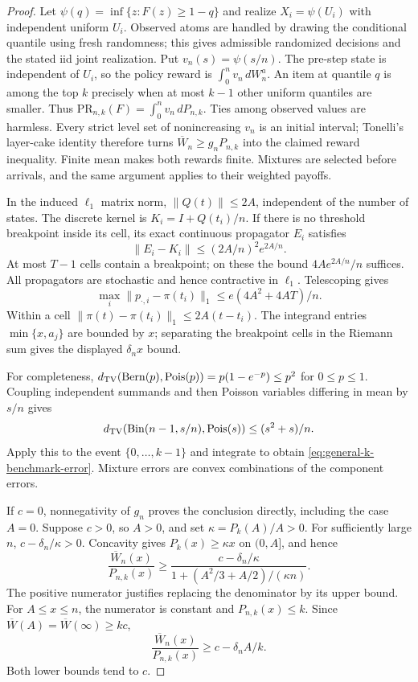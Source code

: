 \documentclass[11pt]{article}
\theoremstyle{remark}
\begin{document}
\begin{proof}
Let $\psi(q)=\inf\{z:F(z)\ge1-q\}$ and realize
$X_i=\psi(U_i)$ with independent uniform $U_i$. Observed atoms are
handled by drawing the conditional quantile using fresh randomness;
this gives admissible randomized decisions and the stated iid joint
realization. Put $v_n(s)=\psi(s/n)$. The pre-step state is independent
of $U_i$, so the policy reward is $\int_0^n v_n\,dW_n^a$. An item at
quantile $q$ is among the top $k$ precisely when at most $k-1$ other
uniform quantiles are smaller. Thus
$\mathrm{PR}_{n,k}(F)=\int_0^n v_n\,dP_{n,k}$. Ties among observed
values are harmless. Every strict level set of nonincreasing $v_n$ is
an initial interval; Tonelli's layer-cake identity therefore turns
$\overline W_n\ge g_nP_{n,k}$ into the claimed reward inequality.
Finite mean makes both rewards finite. Mixtures are selected before
arrivals, and the same argument applies to their weighted payoffs.

In the induced $\ell_1$ matrix norm, $\|Q(t)\|\le2A$, independent of
the number of states. The discrete kernel is $K_i=I+Q(t_i)/n$. If
there is no threshold breakpoint inside its cell, its exact continuous
propagator $E_i$ satisfies
\[
 \|E_i-K_i\|\le(2A/n)^2e^{2A/n}.
\]
At most $T-1$ cells contain a breakpoint; on these the bound
$4Ae^{2A/n}/n$ suffices. All propagators are stochastic and hence
contractive in $\ell_1$. Telescoping gives
\[
 \max_i\|p_{\cdot,i}-\pi(t_i)\|_1
 \le e(4A^2+4AT)/n.
\]
Within a cell $\|\pi(t)-\pi(t_i)\|_1\le2A(t-t_i)$.
The integrand entries $\min\{x,a_j\}$ are bounded by $x$;
separating the breakpoint cells in the Riemann sum gives the displayed
$\delta_nx$ bound.

For completeness,
$d_{\rm TV}(\mathrm{Bern}(p),\mathrm{Pois}(p))
=p(1-e^{-p})\le p^2$ for $0\le p\le1$.
Coupling independent summands and then Poisson variables differing
in mean by $s/n$ gives
\[
 d_{\rm TV}(\mathrm{Bin}(n-1,s/n),\mathrm{Pois}(s))
 \le(s^2+s)/n.
\]
Apply this to the event $\{0,\ldots,k-1\}$ and integrate to obtain
\eqref{eq:general-k-benchmark-error}. Mixture errors are convex
combinations of the component errors.

If $c=0$, nonnegativity of $g_n$ proves the conclusion directly,
including the case $A=0$. Suppose $c>0$, so $A>0$, and set
$\kappa=P_k(A)/A>0$. For sufficiently large $n$,
$c-\delta_n/\kappa>0$. Concavity gives $P_k(x)\ge\kappa x$ on
$(0,A]$, and hence
\[
 \frac{\overline W_n(x)}{P_{n,k}(x)}
 \ge\frac{c-\delta_n/\kappa}
 {1+(A^2/3+A/2)/(\kappa n)}.
\]
The positive numerator justifies replacing the denominator by its
upper bound. For $A\le x\le n$, the numerator is constant and
$P_{n,k}(x)\le k$. Since
$\overline W(A)=\overline W(\infty)\ge kc$,
\[
 \frac{\overline W_n(x)}{P_{n,k}(x)}\ge c-\delta_nA/k.
\]
Both lower bounds tend to $c$.
\end{proof}
\end{document}
